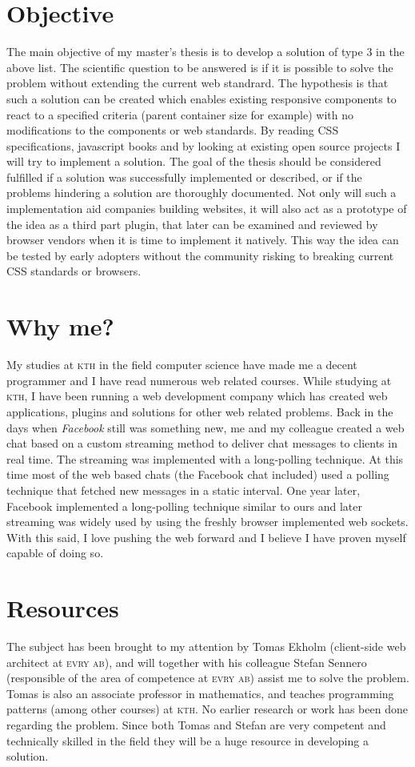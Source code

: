 \documentclass[oneside,a4paper,11pt]{kth-mag}
\begin{document}
\section*{Objective}
The main objective of my master's thesis is to develop a solution of type 3 in the above list. The scientific question to be answered is if it is possible to solve the problem without extending the current web standrard. The hypothesis is that such a solution can be created which enables existing responsive components to react to a specified criteria (parent container size for example) with no modifications to the components or web standards. By reading CSS specifications, javascript books and by looking at existing open source projects I will try to implement a solution. The goal of the thesis should be considered fulfilled if a solution was successfully implemented or described, or if the problems hindering a solution are thoroughly documented. Not only will such a implementation aid companies building websites, it will also act as a prototype of the idea as a third part plugin, that later can be examined and reviewed by browser vendors when it is time to implement it natively. This way the idea can be tested by early adopters without the community risking to breaking current CSS standards or browsers.

\section*{Why me?}
My studies at \textsc{kth} in the field computer science have made me a decent programmer and I have read numerous web related courses. While studying at \textsc{kth}, I have been running a web development company which has created web applications, plugins and solutions for other web related problems. Back in the days when \emph{Facebook} still was something new, me and my colleague created a web chat based on a custom streaming method to deliver chat messages to clients in real time. The streaming was implemented with a long-polling technique. At this time most of the web based chats (the Facebook chat included) used a polling technique that fetched new messages in a static interval. One year later, Facebook implemented a long-polling technique similar to ours and later streaming was widely used by using the freshly browser implemented web sockets. With this said, I love pushing the web forward and I believe I have proven myself capable of doing so.

\section*{Resources}
The subject has been brought to my attention by Tomas Ekholm (client-side web architect at \textsc{evry ab}), and will together with his colleague Stefan Sennero (responsible of the area of competence at \textsc{evry ab}) assist me to solve the problem. Tomas is also an associate professor in mathematics, and teaches programming patterns (among other courses) at \textsc{kth}. No earlier research or work has been done regarding the problem. Since both Tomas and Stefan are very competent and technically skilled in the field they will be a huge resource in developing a solution.
\end{document}

